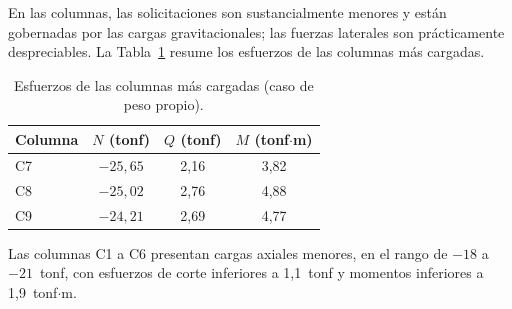 En las columnas, las solicitaciones son sustancialmente menores y están gobernadas por las cargas gravitacionales; las fuerzas laterales son prácticamente despreciables. La Tabla~\ref{tab:esf_columnas} resume los esfuerzos de las columnas más cargadas.

\begin{table}[H]
\centering
\caption{Esfuerzos de las columnas más cargadas (caso de peso propio).}
\label{tab:esf_columnas}
\begin{tabular}{lccc}
\hline
Columna & $N$ (tonf) & $Q$ (tonf) & $M$ (tonf$\cdot$m) \\
\hline
C7 & $-25,65$ & 2,16 & 3,82 \\
C8 & $-25,02$ & 2,76 & 4,88 \\
C9 & $-24,21$ & 2,69 & 4,77 \\
\hline
\end{tabular}
\end{table}

Las columnas C1 a C6 presentan cargas axiales menores, en el rango de $-18$ a $-21$~tonf, con esfuerzos de corte inferiores a 1,1~tonf y momentos inferiores a 1,9~tonf$\cdot$m.